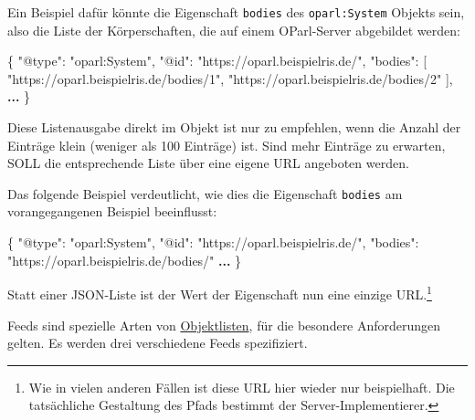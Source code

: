 \documentclass[,a4paper]{article}
\newenvironment{Shaded}{}{}
\newcommand{\DataTypeTok}[1]{\textcolor[rgb]{0.56,0.13,0.00}{{#1}}}
\newcommand{\StringTok}[1]{\textcolor[rgb]{0.25,0.44,0.63}{{#1}}}
\newcommand{\ErrorTok}[1]{\textcolor[rgb]{1.00,0.00,0.00}{\textbf{{#1}}}}
\newcommand{\NormalTok}[1]{{#1}}
\begin{document}
Ein Beispiel dafür könnte die Eigenschaft \texttt{bodies} des
\texttt{oparl:System} Objekts sein, also die Liste der Körperschaften,
die auf einem OParl-Server abgebildet werden:

\begin{Shaded}
\begin{Highlighting}[]
\NormalTok{\{}
    \DataTypeTok{"@type"}\NormalTok{: }\StringTok{"oparl:System"}\NormalTok{,}
    \DataTypeTok{"@id"}\NormalTok{: }\StringTok{"https://oparl.beispielris.de/"}\NormalTok{,}
    \DataTypeTok{"bodies"}\NormalTok{: [}
        \StringTok{"https://oparl.beispielris.de/bodies/1"}\NormalTok{,}
        \StringTok{"https://oparl.beispielris.de/bodies/2"}
    \NormalTok{],}
    \ErrorTok{...}
\NormalTok{\}}
\end{Highlighting}
\end{Shaded}

Diese Listenausgabe direkt im Objekt ist nur zu empfehlen, wenn die
Anzahl der Einträge klein (weniger als 100 Einträge) ist. Sind mehr
Einträge zu erwarten, SOLL die entsprechende Liste über eine eigene URL
angeboten werden.

Das folgende Beispiel verdeutlicht, wie dies die Eigenschaft
\texttt{bodies} am vorangegangenen Beispiel beeinflusst:

\begin{Shaded}
\begin{Highlighting}[]
\NormalTok{\{}
    \DataTypeTok{"@type"}\NormalTok{: }\StringTok{"oparl:System"}\NormalTok{,}
    \DataTypeTok{"@id"}\NormalTok{: }\StringTok{"https://oparl.beispielris.de/"}\NormalTok{,}
    \DataTypeTok{"bodies"}\NormalTok{: }\StringTok{"https://oparl.beispielris.de/bodies/"}
    \ErrorTok{...}
\NormalTok{\}}
\end{Highlighting}
\end{Shaded}

Statt einer JSON-Liste ist der Wert der Eigenschaft nun eine einzige
URL.\footnote{Wie in vielen anderen Fällen ist diese URL hier wieder nur
  beispielhaft. Die tatsächliche Gestaltung des Pfads bestimmt der
  Server-Implementierer.}


Feeds sind spezielle Arten von \hyperref[objektlisten]{Objektlisten},
für die besondere Anforderungen gelten. Es werden drei verschiedene
Feeds spezifiziert.
\end{document}
